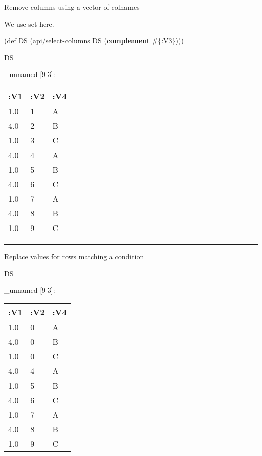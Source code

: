 \documentclass[]{article}
\newenvironment{Shaded}{\begin{snugshade}}{\end{snugshade}}
\newcommand{\AttributeTok}[1]{\textcolor[rgb]{0.77,0.63,0.00}{#1}}
\newcommand{\BuiltInTok}[1]{#1}
\newcommand{\FloatTok}[1]{\textcolor[rgb]{0.00,0.00,0.81}{#1}}
\newcommand{\FunctionTok}[1]{\textcolor[rgb]{0.00,0.00,0.00}{#1}}
\newcommand{\KeywordTok}[1]{\textcolor[rgb]{0.13,0.29,0.53}{\textbf{#1}}}
\newcommand{\NormalTok}[1]{#1}
\newcommand{\VariableTok}[1]{\textcolor[rgb]{0.00,0.00,0.00}{#1}}
\begin{document}
Remove columns using a vector of colnames

We use set here.

\begin{Shaded}
\begin{Highlighting}[]
\NormalTok{(}\BuiltInTok{def}\FunctionTok{ DS }\NormalTok{(api/select-columns DS (}\KeywordTok{complement}\NormalTok{ #\{}\AttributeTok{:V3}\NormalTok{\})))}
\end{Highlighting}
\end{Shaded}

\begin{Shaded}
\begin{Highlighting}[]
\NormalTok{DS}
\end{Highlighting}
\end{Shaded}

\_unnamed {[}9 3{]}:

\begin{longtable}[]{@{}lll@{}}
\toprule
:V1 & :V2 & :V4\tabularnewline
\midrule
\endhead
1.0 & 1 & A\tabularnewline
4.0 & 2 & B\tabularnewline
1.0 & 3 & C\tabularnewline
4.0 & 4 & A\tabularnewline
1.0 & 5 & B\tabularnewline
4.0 & 6 & C\tabularnewline
1.0 & 7 & A\tabularnewline
4.0 & 8 & B\tabularnewline
1.0 & 9 & C\tabularnewline
\bottomrule
\end{longtable}

\begin{center}\rule{0.5\linewidth}{0.5pt}\end{center}

Replace values for rows matching a condition

\begin{Shaded}
\end{Shaded}

\begin{Shaded}
\begin{Highlighting}[]
\NormalTok{DS}
\end{Highlighting}
\end{Shaded}

\_unnamed {[}9 3{]}:

\begin{longtable}[]{@{}lll@{}}
\toprule
:V1 & :V2 & :V4\tabularnewline
\midrule
\endhead
1.0 & 0 & A\tabularnewline
4.0 & 0 & B\tabularnewline
1.0 & 0 & C\tabularnewline
4.0 & 4 & A\tabularnewline
1.0 & 5 & B\tabularnewline
4.0 & 6 & C\tabularnewline
1.0 & 7 & A\tabularnewline
4.0 & 8 & B\tabularnewline
1.0 & 9 & C\tabularnewline
\bottomrule
\end{longtable}
\end{document}

